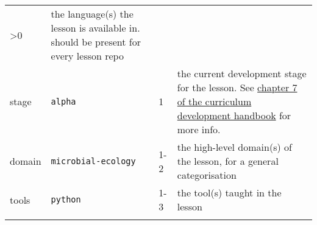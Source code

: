 \documentclass[
]{book}
\begin{document}
\begin{longtable}[]{@{}llll@{}}
\begin{minipage}[t]{0.21\columnwidth}
\textgreater0\strut
\end{minipage} & \begin{minipage}[t]{0.16\columnwidth}\raggedright
the language(s) the lesson is available in. should be present for every lesson repo\strut
\end{minipage}\tabularnewline
\begin{minipage}[t]{0.26\columnwidth}\raggedright
stage\strut
\end{minipage} & \begin{minipage}[t]{0.26\columnwidth}\raggedright
\texttt{alpha}\strut
\end{minipage} & \begin{minipage}[t]{0.21\columnwidth}\raggedright
1\strut
\end{minipage} & \begin{minipage}[t]{0.16\columnwidth}\raggedright
the current development stage for the lesson. See \href{https://cdh.carpentries.org/the-lesson-life-cycle.html}{chapter 7 of the curriculum development handbook} for more info.\strut
\end{minipage}\tabularnewline
\begin{minipage}[t]{0.26\columnwidth}\raggedright
domain\strut
\end{minipage} & \begin{minipage}[t]{0.26\columnwidth}\raggedright
\texttt{microbial-ecology}\strut
\end{minipage} & \begin{minipage}[t]{0.21\columnwidth}\raggedright
1-2\strut
\end{minipage} & \begin{minipage}[t]{0.16\columnwidth}\raggedright
the high-level domain(s) of the lesson, for a general categorisation\strut
\end{minipage}\tabularnewline
\begin{minipage}[t]{0.26\columnwidth}\raggedright
tools\strut
\end{minipage} & \begin{minipage}[t]{0.26\columnwidth}\raggedright
\texttt{python}\strut
\end{minipage} & \begin{minipage}[t]{0.21\columnwidth}\raggedright
1-3\strut
\end{minipage} & \begin{minipage}[t]{0.16\columnwidth}\raggedright
the tool(s) taught in the lesson\strut
\end{minipage}\tabularnewline
\begin{minipage}[t]{0.26\columnwidth}\raggedright

\end{minipage}
\end{longtable}
\end{document}
